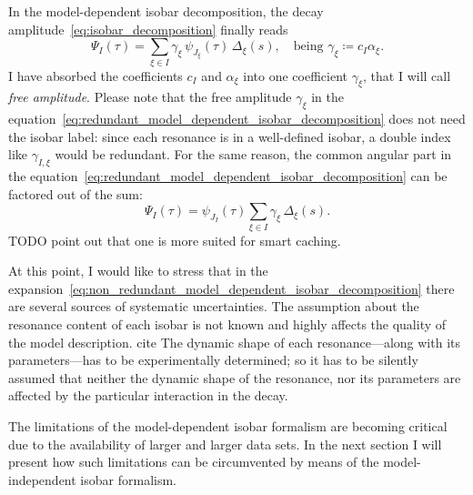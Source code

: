     In the model-dependent isobar decomposition, the decay amplitude~\eqref{eq:isobar_decomposition} finally reads
    \begin{equation}\label{eq:redundant_model_dependent_isobar_decomposition}
        \Psi_I(\tau) =  \sum_{\xi\in I} \gamma_\xi \,\psi_{J_\xi}\!(\tau)\,\Delta_{\xi}(s),\quad
        \text{being }
        \gamma_\xi\coloneqq c_I \alpha_{\xi}.
    \end{equation}
    I have absorbed the coefficients $c_I$ and $\alpha_\xi$ into one coefficient $\gamma_{\xi}$, that I will call \emph{free amplitude}.
    Please note that the free amplitude $\gamma_\xi$ in the equation~\eqref{eq:redundant_model_dependent_isobar_decomposition} does not need the isobar label: since each resonance is in a well-defined isobar, a double index like $\gamma_{I,\xi}$ would be redundant.
    For the same reason, the common angular part in the equation~\eqref{eq:redundant_model_dependent_isobar_decomposition} can be factored out of the sum:
    \begin{equation}\label{eq:non_redundant_model_dependent_isobar_decomposition}
        \Psi_I(\tau) =  \psi_{J_I}\!(\tau)\sum_{\xi\in I} \gamma_\xi \,\Delta_{\xi}(s).
    \end{equation}
    {\color{red} TODO point out that one is more suited for smart caching.}




    At this point, I would like to stress that in the expansion~\eqref{eq:non_redundant_model_dependent_isobar_decomposition} there are several sources of systematic uncertainties.
    The assumption about the resonance content of each isobar is not known and highly affects the quality of the model description. {\color{red} cite \cite{PhysRevD.76.012001}}
    The dynamic shape of each resonance---along with its parameters---has to be experimentally determined; so it has to be silently assumed that neither the dynamic shape of the resonance, nor its parameters are affected by the particular interaction in the decay.


    The limitations of the model-dependent isobar formalism are becoming critical due to the availability of larger and larger data sets.
    In the next section I will present how such limitations can be circumvented by means of the model-independent isobar formalism.

